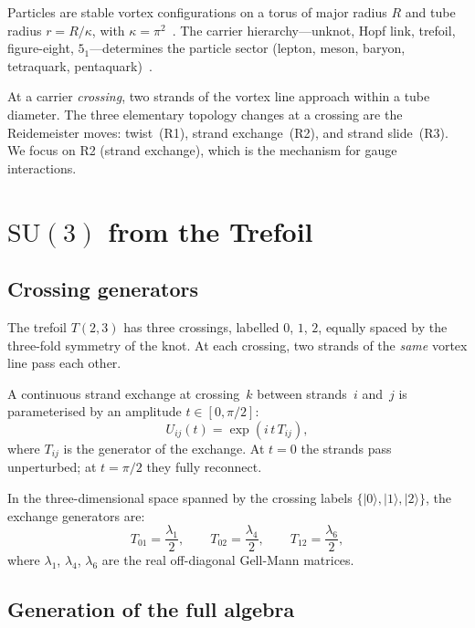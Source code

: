 \documentclass[11pt,a4paper]{article}
\begin{document}
Particles are stable vortex configurations on a torus of major
radius $R$ and tube radius $r = R/\kappa$, with
$\kappa = \pi^2$~\cite{paper5}.  The carrier hierarchy---unknot,
Hopf link, trefoil, figure-eight, $5_1$---determines the particle
sector (lepton, meson, baryon, tetraquark,
pentaquark)~\cite{paper8_old}.

At a carrier \emph{crossing}, two strands of the vortex line
approach within a tube diameter.  The three elementary topology
changes at a crossing are the Reidemeister moves: twist~(R1),
strand exchange~(R2), and strand slide~(R3).  We focus on R2
(strand exchange), which is the mechanism for gauge interactions.


\section{$\mathrm{SU}(3)$ from the Trefoil}
\label{sec:su3}

\subsection{Crossing generators}

The trefoil $T(2,3)$ has three crossings, labelled $0$, $1$, $2$,
equally spaced by the three-fold symmetry of the knot.  At each
crossing, two strands of the \emph{same} vortex line pass each
other.

A continuous strand exchange at crossing~$k$ between
strands~$i$ and~$j$ is parameterised by an amplitude
$t \in [0, \pi/2]$:
\begin{equation}
  U_{ij}(t) = \exp(i\,t\,T_{ij}),
  \label{eq:exchange}
\end{equation}
where $T_{ij}$ is the generator of the exchange.  At $t = 0$
the strands pass unperturbed; at $t = \pi/2$ they fully reconnect.

In the three-dimensional space spanned by the crossing labels
$\{|0\rangle, |1\rangle, |2\rangle\}$, the exchange generators
are:
\begin{equation}
  T_{01} = \frac{\lambda_1}{2}, \qquad
  T_{02} = \frac{\lambda_4}{2}, \qquad
  T_{12} = \frac{\lambda_6}{2},
  \label{eq:generators}
\end{equation}
where $\lambda_1$, $\lambda_4$, $\lambda_6$ are the real
off-diagonal Gell-Mann matrices.


\subsection{Generation of the full algebra}
\end{document}
